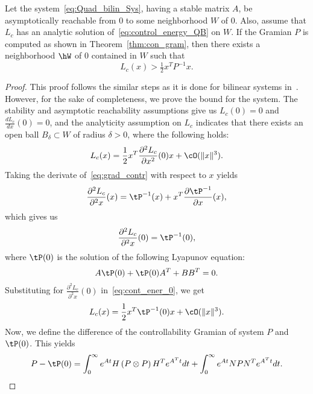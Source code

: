 \begin{theorem}\label{thm:con_bound}
 Let the system~\eqref{eq:Quad_bilin_Sys}, having a stable matrix $A$, be asymptotically reachable from $0$ to some neighborhood $W$ of $0$. Also, assume that $L_c$ has an analytic solution of~\eqref{eq:control_energy_QB} on $W$. If the Gramian $P$ is computed as shown in Theorem~\ref{thm:con_gram}, then there exists a neighborhood $\hW$ of $0$ contained in $W$ such that
 \begin{equation*}
     L_c(x) >\tfrac{1}{2}x^T P^{-1}x.
 \end{equation*}
\end{theorem}
\begin{proof}
This proof follows the similar steps as it is done for bilinear systems in~\cite{enefungray98}. However, for the sake of completeness, we prove the bound for the system.  The stability and asymptotic reachability assumptions give us $L_c(0)=0$ and $\tfrac{d L_c}{dx}(0) = 0$, and the analyticity assumption on $L_c$ indicates that there exists an open ball $B_\delta \subset W$  of radius $\delta >0$, where the following holds:
 \begin{equation}\label{eq:cont_ener_0}
  L_c(x) = \dfrac{1}{2}x^T\dfrac{\partial^2 L_c}{\partial x^2}(0)x + \cO(\|x\|^3).
 \end{equation}
Taking the derivate of~\eqref{eq:grad_contr} with respect to $x$ yields
 \begin{equation*}
  \dfrac{\partial ^2 L_c } {\partial^2 x}(x) =  \tP^{-1}(x) + x^T \dfrac{\partial \tP^{-1}} {\partial x}(x),
 \end{equation*}
which gives us
 \begin{equation*}
  \dfrac{\partial ^2 L_c } {\partial^2 x}(0) =  \tP^{-1}(0),
 \end{equation*}
where $\tP(0)$ is the solution of the following Lyapunov equation:
\begin{equation}\label{eq:linear_lyp}
 A\tP(0) + \tP(0)A^T + BB^T = 0.
\end{equation}
Substituting for $\tfrac{\partial ^2 L_c } {\partial^2 x}(0)$ in~\eqref{eq:cont_ener_0}, we get
 \begin{equation}\label{eq:cont_ener_1}
  L_c(x) = \dfrac{1}{2}x^T\tP^{-1}(0)x + \cO(\|x\|^3).
 \end{equation}
Now, we define the difference of the controllability Gramian of system $P$ and $\tP(0)$. This yields
\begin{equation*}
 P-\tP(0) = \int_0^\infty e^{At}H\left(P\otimes P\right) H^T e^{A^Tt}dt  + \int_0^\infty e^{At}N P N^T e^{A^Tt}dt.

\end{equation*}
\end{proof}

